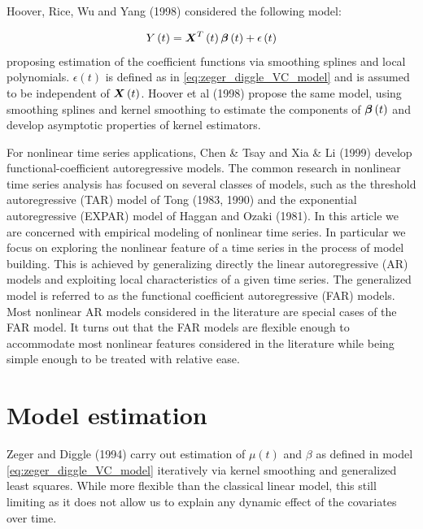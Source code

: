 \documentclass[12pt]{article}
\newcommand*\needsparaphrased{\color{red}}
\newcommand{\bfbeta}{\mbox{\boldmath $\beta$}}
\newcommand{\bfX}{\mbox{\boldmath $X$}}
\begin{document}
{Hoover, Rice, Wu and Yang (1998) considered the following model:

\begin{equation} \label{eq:hoover_rice_wu_VC_model}
Y\left(t\right) =  \bfX^T\left(t\right)\bfbeta \left(t\right) + \epsilon\left(t\right) 
\end{equation}
\noindent
proposing estimation of the coefficient functions via smoothing splines and local polynomials. $\epsilon\left(t\right)$ is defined as in \ref{eq:zeger_diggle_VC_model} and is assumed to be independent of $\bfX\left(t\right)$. Hoover et al (1998) propose the same model, using smoothing splines and kernel smoothing to estimate  the components of $\bfbeta\left(t\right)$ and develop asymptotic properties of kernel estimators. 



For nonlinear time series applications, Chen \& Tsay \cite{chen1993functional} and Xia \& Li (1999) develop functional-coefficient autoregressive models. The common research in nonlinear time series analysis has focused on several classes of models, such as the threshold autoregressive (TAR) model of Tong (1983, 1990) and the exponential autoregressive (EXPAR) model of Haggan and Ozaki (1981). {\needsparaphrased In this article we are concerned with empirical modeling of nonlinear time series. In particular we focus on exploring the nonlinear feature of a time series in the process of model building. This is achieved by generalizing directly the linear autoregressive (AR) models and exploiting local characteristics of a given time series. The generalized model is referred to as the functional coefficient autoregressive (FAR) models. Most nonlinear AR models considered in the literature are special cases of the FAR model. It turns out that the FAR models are flexible enough to accommodate most nonlinear features considered in the literature while being simple enough to be treated with relative ease. }


\section{Model estimation}

Zeger and Diggle (1994) carry out estimation of $\mu\left(t\right)$ and $\beta$ as defined in model \ref{eq:zeger_diggle_VC_model} iteratively via kernel smoothing and generalized least squares. While more flexible than the classical linear model, this still limiting as it does not allow us to explain any dynamic effect of the covariates over time.  


}
\end{document}
